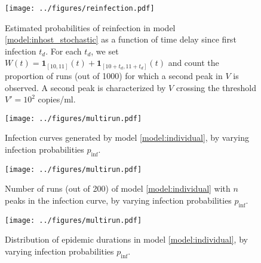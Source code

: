 \documentclass[11pt]{article}
\numberwithin{equation}{subsection}
\begin{document}
    \begin{figure}[h!]
    \begin{center}
        \texttt{[image: ../figures/reinfection.pdf]}
    \end{center}
    \caption{
        Estimated probabilities of reinfection in model
        \ref{model:inhost_stochastic} as a function of time delay since first
        infection $t_d$.  For each $t_d$, we set $W(t) = \mathbf{1}_{[10,
        11]}(t) + \mathbf{1}_{[10 + t_d, 11 + t_d]}(t)$ and count the
        proportion of runs (out of 1000) for which a second peak in $V$ is
        observed. A second peak is characterized by $V$ crossing the threshold
        $V' = 10^2$ copies/ml.
    }
    \label{fig:reinfection}
    \end{figure}

    \begin{figure}[h!]
    \begin{center}
        \texttt{[image: ../figures/multirun.pdf]}
    \end{center}
    \caption{
        Infection curves generated by model \ref{model:individual}, by varying
        infection probabilities $p_\text{inf}$.
    }
    \label{fig:multiruns}
    \end{figure}


    \begin{figure}[h!]
    \begin{center}
        \texttt{[image: ../figures/multirun.pdf]}
    \end{center}
    \caption{
        Number of runs (out of 200) of model \ref{model:individual} with $n$
        peaks in the infection curve, by varying infection probabilities
        $p_\text{inf}$.
    }
    \label{fig:peaks}
    \end{figure}

    \begin{figure}[h!]
    \begin{center}
        \texttt{[image: ../figures/multirun.pdf]}
    \end{center}
    \caption{
        Distribution of epidemic durations in model \ref{model:individual}, by
        varying infection probabilities $p_\text{inf}$.
    }
    \label{fig:durations}
    \end{figure}
\end{document}
